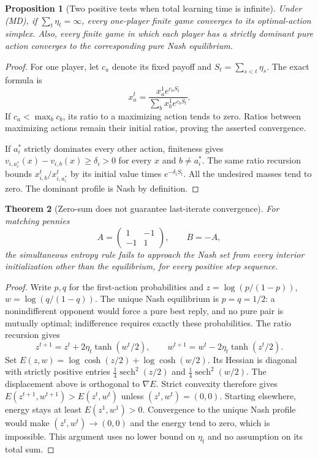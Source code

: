 \documentclass[11pt,a4paper]{article}
\newtheorem{theorem}{Theorem}[section]
\newtheorem{proposition}[theorem]{Proposition}
\theoremstyle{definition}
\theoremstyle{remark}
\begin{document}
\begin{proposition}[Two positive tests when total learning time is infinite]
Under (MD), if $\sum_t\eta_t=\infty$, every one-player finite game converges to its
optimal-action simplex. Also, every finite game in which each player has a strictly
dominant pure action converges to the corresponding pure Nash equilibrium.
\end{proposition}
\begin{proof}
For one player, let $c_a$ denote its fixed payoff and
$S_t=\sum_{s<t}\eta_s$. The exact formula is
\[
 x_a^t=\frac{x_a^1e^{c_aS_t}}{\sum_bx_b^1e^{c_bS_t}}.
\]
If $c_a<\max_b c_b$, its ratio to a maximizing action tends to zero. Ratios between
maximizing actions remain their initial ratios, proving the asserted convergence.

If $a_i^*$ strictly dominates every other action, finiteness gives
$v_{i,a_i^*}(x)-v_{i,b}(x)\geq\delta_i>0$ for every $x$ and $b\ne a_i^*$.
The same ratio recursion bounds
$x_{i,b}^t/x_{i,a_i^*}^t$ by its initial value times $e^{-\delta_iS_t}$.
All the undesired masses tend to zero. The dominant profile is Nash by definition.
\end{proof}

\begin{theorem}[Zero-sum does not guarantee last-iterate convergence]
For matching pennies
\[
 A=\begin{pmatrix}1&-1\\-1&1\end{pmatrix},\qquad B=-A,
\]
the simultaneous entropy rule fails to approach the Nash set from every interior
initialization other than the equilibrium, for every positive step sequence.
\end{theorem}
\begin{proof}
Write $p,q$ for the first-action probabilities and
$z=\log(p/(1-p))$, $w=\log(q/(1-q))$. The unique Nash equilibrium is
$p=q=1/2$: a nonindifferent opponent would force a pure best reply, and no pure
pair is mutually optimal; indifference requires exactly these probabilities.
The ratio recursion gives
\[
 z^{t+1}=z^t+2\eta_t\tanh(w^t/2),\qquad
 w^{t+1}=w^t-2\eta_t\tanh(z^t/2).
\]
Set $E(z,w)=\log\cosh(z/2)+\log\cosh(w/2)$. Its Hessian is diagonal with strictly
positive entries $\tfrac14\operatorname{sech}^2(z/2)$ and
$\tfrac14\operatorname{sech}^2(w/2)$. The displacement above is orthogonal to
$\nabla E$. Strict convexity therefore gives
$E(z^{t+1},w^{t+1})>E(z^t,w^t)$ unless $(z^t,w^t)=(0,0)$.
Starting elsewhere, energy stays at least $E(z^1,w^1)>0$. Convergence to the unique
Nash profile would make $(z^t,w^t)\to(0,0)$ and the energy tend to zero, which is
impossible. This argument uses no lower bound on $\eta_t$ and no assumption on
its total sum.
\end{proof}
\end{document}
